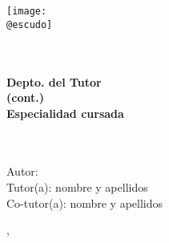 \begin{titlepage}
    \makeatletter
	\begin{center}
        \vspace{1cm}
		\texttt{[image: \\@escudo]}\vspace{1cm}
		
		{\LARGE \textbf{\@instEdu \\[0.5ex]
				\@centroEdu}}\\[0.5cm]
		{\Large \textbf{Depto. del Tutor}}\\ \smallskip%
        {\Large\textbf{(cont.)}}\\[0.5cm]
		{\large \textbf{Especialidad cursada}}\\[1.5cm]
		{\LARGE \textbf{\@tipoDoc}}\\[1cm]
		
		
		{\LARGE \textbf{\@tituloPrimera}}\\ \smallskip%
		\ifdefined\@tituloSegunda{\LARGE \textbf{\@tituloSegunda}}
		\else \phantom{\LARGE Texto fantasma}
		\fi
	\end{center}
	\vfill%
	\begin{flushleft}
		{\Large Autor: \@autor} \\ \bigskip%
		{\Large Tutor(a): nombre y apellidos} \\ \bigskip%
		{\Large Co-tutor(a): nombre y apellidos}
	\end{flushleft}
	\vspace{2cm}%
	\begin{flushright}
		{\Large \ifspanish \@mesTF \else \@monthTF \fi, \@yearTF}
	\end{flushright}
	\cleardoublepage
    \makeatother
\end{titlepage}
	









